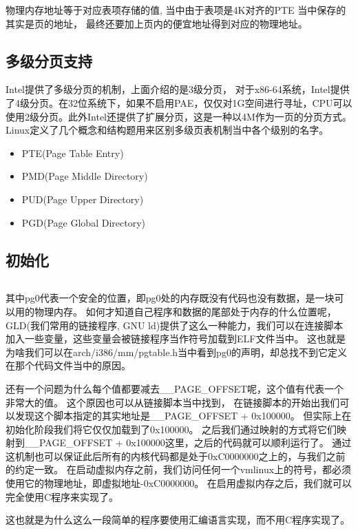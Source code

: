 物理内存地址等于对应表项存储的值, 当中由于表项是4K对齐的PTE 当中保存的其实是页的地址， 最终还要加上页内的便宜地址得到对应的物理地址。

\subsection{多级分页支持}

Intel提供了多级分页的机制，上面介绍的是3级分页， 对于x86-64系统，Intel提供了4级分页。在32位系统下，如果不启用PAE，仅仅对1G空间进行寻址，CPU可以使用2级分页。此外Intel还提供了扩展分页，这是一种以4M作为一页的分页方式。Linux定义了几个概念和结构题用来区别多级页表机制当中各个级别的名字。
\begin{itemize}
  \item PTE(Page Table Entry)
  \item PMD(Page Middle Directory)
  \item PUD(Page Upper Directory)
  \item PGD(Page Global Directory)
\end{itemize}

\subsection{初始化}

\begin{lstlisting}
\end{lstlisting}

其中pg0代表一个安全的位置，即pg0处的内存既没有代码也没有数据，是一块可以用的物理内存。
如何才知道自己程序和数据的尾部处于内存的什么位置呢， GLD(我们常用的链接程序, GNU ld)提供了这么一种能力，我们可以在连接脚本加入一些变量，这些变量会被链接程序当作符号加载到ELF文件当中。
这也就是为啥我们可以在arch/i386/mm/pgtable.h当中看到pg0的声明，却总找不到它定义在那个代码文件当中的原因。

还有一个问题为什么每个值都要减去\_\_PAGE\_OFFSET呢，这个值有代表一个非常大的值。
这个原因也可以从链接脚本当中找到， 在链接脚本的开始出我们可以发现这个脚本指定的其实地址是\_\_PAGE\_OFFSET + 0x100000。
但实际上在初始化阶段我们将它仅仅加载到了0x100000。
之后我们通过映射的方式将它们映射到\_\_PAGE\_OFFSET + 0x100000这里，之后的代码就可以顺利运行了。
通过这机制也可以保证此后所有的内核代码都是处于0xC0000000之上的，与我们之前的约定一致。
在启动虚拟内存之前，我们访问任何一个vmlinux上的符号，都必须使用它的物理地址，即虚拟地址-0xC0000000。
在启用虚拟内存之后，我们就可以完全使用C程序来实现了。

这也就是为什么这么一段简单的程序要使用汇编语言实现，而不用C程序实现了。

